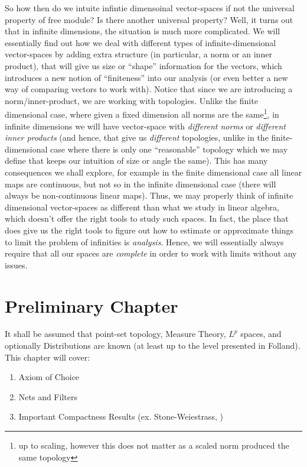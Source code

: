 \documentclass[oneside]{book}
\begin{document}
So how then do we intuite infintie dimensoinal vector-spaces if not the universal property of free module? Is there
another universal property? Well, it turns out that in infinite dimensions, the situation is much more complicated. We
will essentially find out how we deal with different types of infinite-dimensional vector-spaces by adding extra
structure (in particular, a norm or an inner product), that will give us size or ``shape'' information for the vectors,
which introduces a new notion of ``finiteness'' into our analysis (or even better a new way of comparing vectors to work
with). Notice that since we are introducing a norm/inner-product, we are working with topologies. Unlike the finite
dimensional case, where given a fixed dimension all norms are the same\footnote{up to scaling, however this does not
matter as a scaled norm produced the same topology}, in infinite dimensions we will have vector-space
with \emph{different norms} or \emph{different inner products} (and hence, that give us \emph{different} topologies,
unlike in the finite-dimensional case where there is only one ``reasonable'' topology which we may define that keeps our
intuition of size or angle the same). This has many consequences we shall explore, for example in the finite dimensional
case all linear maps are continuous, but not so in the infinite dimensional case (there will always be non-continuous
linear maps). Thus, we may properly think of infinite dimensional vector-spaces as different than what we study in
linear algebra, which doesn't offer the right tools to study such spaces. In fact, the place that does give us the right
tools to figure out how to estimate or approximate things to limit the problem of infinities is \emph{analysis}. Hence,
we will essentially always require that all our spaces are \emph{complete} in order to work with limits without any
issues.

\chapter{Preliminary Chapter}\label{cha:prelimCha}

It shall be assumed that point-set topology, Measure Theory, $L^p$ spaces, and optionally Distributions are
known (at least up to the level presented in Folland). This chapter will cover:
\begin{enumerate}
	\item Axiom of Choice
	\item Nets and Filters
	\item Important Compactness Results (ex. Stone-Weiestrass, )
\end{enumerate}
\end{document}
